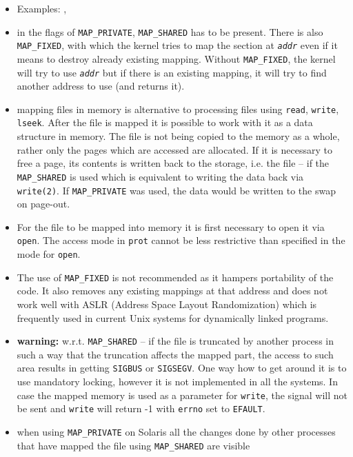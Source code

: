 \begin{itemize}
\setlength{\itemsep}{0.8\itemsep}
\item Examples: , 
\item in the flags  of \texttt{MAP\_PRIVATE},
\texttt{MAP\_SHARED} has to be present.
There is also \texttt{MAP\_FIXED}, with which the
kernel tries to map the section at \emph{\texttt{addr}} even if it means to
destroy already existing mapping.  Without \texttt{MAP\_FIXED}, the kernel
will try to use \emph{\texttt{addr}} but if there is an existing mapping, it
will try to find another address to use (and returns it).
\item mapping files in memory is alternative to processing files using
\texttt{read}, \texttt{write}, \texttt{lseek}.  After the file is mapped it is
possible to work with it as a data structure in memory. The file is not being
copied to the memory as a whole, rather only the pages which are accessed are
allocated. If it is necessary to free a page, its contents is written back
to the storage, i.e. the file -- if the \texttt{MAP\_SHARED} is used
which is equivalent to writing the data back via \texttt{write(2)}.  If
\texttt{MAP\_PRIVATE} was used, the data would be written to the swap on
page-out.
\item For the file to be mapped into memory it is first necessary to open it
via \texttt{open}. The access mode in \texttt{prot} cannot be less restrictive
than specified in the mode for \texttt{open}.
\item The use of \texttt{MAP\_FIXED} is not recommended as it hampers
portability of the code. It also removes any existing mappings at that address
and does not work well with ASLR (Address Space Layout Randomization) which is
frequently used in current Unix systems for dynamically linked programs.
\item \textbf{warning:} w.r.t. \texttt{MAP\_SHARED} -- if the file is truncated
by another process in such a way that the truncation affects the mapped part,
the access to such area results in getting \texttt{SIGBUS} or \texttt{SIGSEGV}.
One way how to get around it is to use mandatory locking, however it is not
implemented in all the systems.  In case the mapped memory is used as a
parameter for \texttt{write}, the signal will not be sent and \texttt{write}
will return -1 with \texttt{errno} set to \texttt{EFAULT}.
\item when using \texttt{MAP\_PRIVATE} on Solaris all the changes done by other
processes that have mapped the file using \texttt{MAP\_SHARED} are visible

\end{itemize}
